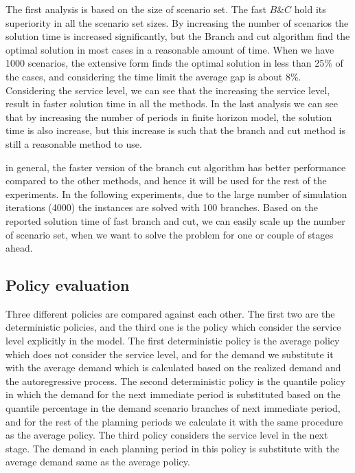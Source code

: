 \documentclass[10pt]{article}
\begin{document}
The first analysis is based on the size of scenario set. The fast $B \& C$ hold its superiority in all the scenario set sizes. By increasing the number of scenarios the solution time is increased significantly, but the Branch and cut algorithm find the optimal solution in most cases in a reasonable amount of time. When we have 1000 scenarios, the extensive form finds the optimal solution in less than 25\% of the cases, and considering the time limit the average gap is about 8\%. Considering the service level, we can see that the increasing the service level, result in faster solution time in all the methods. In the last analysis we can see that by increasing the number of periods in finite horizon model, the solution time is also increase, but this increase is such that the branch and cut method is still a reasonable method to use.

in general, the faster version of the branch cut algorithm has  better performance compared to the other methods, and hence it will be used for the rest of the experiments. 
In the following experiments, due to the large number of simulation iterations (4000) the instances are solved with 100 branches. Based on the reported solution time of fast branch and cut, we can easily scale up the number of scenario set, when we want to solve the problem for one or couple of stages ahead.

\subsection{Policy evaluation}

Three different policies are compared against each other. The first two are the deterministic policies, and the third one is the policy which consider the service level explicitly in the model. The first deterministic policy is the average policy which does not consider the service level, and for the demand we substitute it with the average demand which is calculated based on the realized demand and the autoregressive process.
The second deterministic policy is the quantile policy in which the demand for the next immediate period is substituted based on the quantile percentage in the demand scenario branches of next immediate period, and for the rest of the planning periods we calculate it with the same procedure as the average policy.
The third policy considers the service level in the next stage. The demand in each planning period in this policy is substitute with the average demand same as the average policy.
\end{document}
